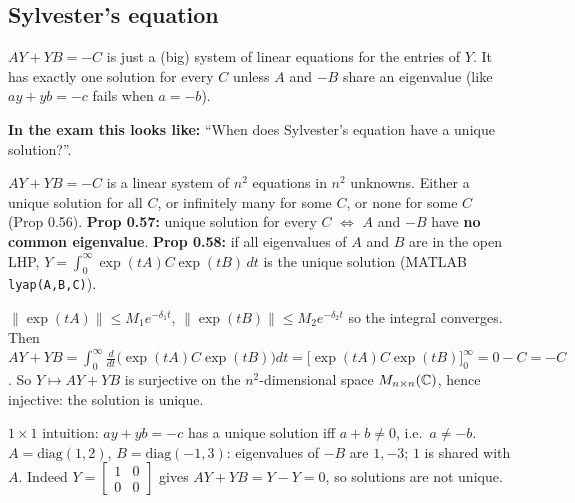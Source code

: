 \subsection{Sylvester's equation \texorpdfstring{}{}}\label{sec:sylv}\label{ss:5-10}
\begin{plainbox}
$AY+YB=-C$ is just a (big) system of linear equations for the entries of $Y$. It has exactly one solution for every $C$ unless
$A$ and $-B$ share an eigenvalue (like $ay+yb=-c$ fails when $a=-b$).
\par\smallskip\textbf{In the exam this looks like:} ``When does Sylvester's equation have a unique solution?''.
\end{plainbox}
\begin{thmbox}
$AY+YB=-C$ is a linear system of $n^2$ equations in $n^2$ unknowns. Either a unique solution for all $C$, or infinitely many for some $C$, or none for some $C$ (Prop 0.56).
\textbf{Prop 0.57:} unique solution for every $C$ $\iff$ $A$ and $-B$ have \textbf{no common eigenvalue}.
\textbf{Prop 0.58:} if all eigenvalues of $A$ and $B$ are in the open LHP, $Y=\int_0^\infty\exp(tA)C\exp(tB)\,dt$ is the unique solution (MATLAB \texttt{lyap(A,B,C)}).
\end{thmbox}
\begin{proofbox}[title={Proof of Prop 0.58}]
$\|\exp(tA)\|\le M_1e^{-\delta_1t}$, $\|\exp(tB)\|\le M_2e^{-\delta_2t}$ so the integral converges. Then
$AY+YB=\int_0^\infty\frac{d}{dt}\big(\exp(tA)C\exp(tB)\big)dt=\big[\exp(tA)C\exp(tB)\big]_0^\infty=0-C=-C$.
So $Y\mapsto AY+YB$ is surjective on the $n^2$-dimensional space $M_{n\times n}(\mathbb{C})$, hence injective: the solution is unique.
\end{proofbox}
\begin{workbox}[title={Worked example}]
$1\times1$ intuition: $ay+yb=-c$ has a unique solution iff $a+b\neq0$, i.e.\ $a\neq-b$.\\
$A=\mathrm{diag}(1,2)$, $B=\mathrm{diag}(-1,3)$: eigenvalues of $-B$ are $1,-3$; $1$ is shared with $A$. Indeed $Y=\begin{bmatrix}1&0\\0&0\end{bmatrix}$ gives $AY+YB=Y-Y=0$, so solutions are not unique.
\end{workbox}

